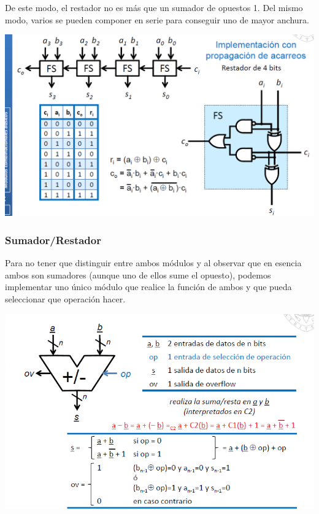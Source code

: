 \documentclass[a4paper,10pt]{book}
\begin{document}
De este modo, el restador no es más que un sumador de opuestos 1. Del mismo modo, varios se pueden componer en serie para conseguir uno de mayor anchura.

\begin{center}
\includegraphics[scale=0.5]{Restador tripas}
\end{center}

\subsubsection*{Sumador/Restador}
Para no tener que distinguir entre ambos módulos y al observar que en esencia ambos son sumadores (aunque uno de ellos sume el opuesto), podemos implementar uno único módulo que realice la función de ambos y que pueda seleccionar que operación hacer.

\begin{center}
\includegraphics[scale=0.75]{sumador_restador}
\end{center}
\end{document}
